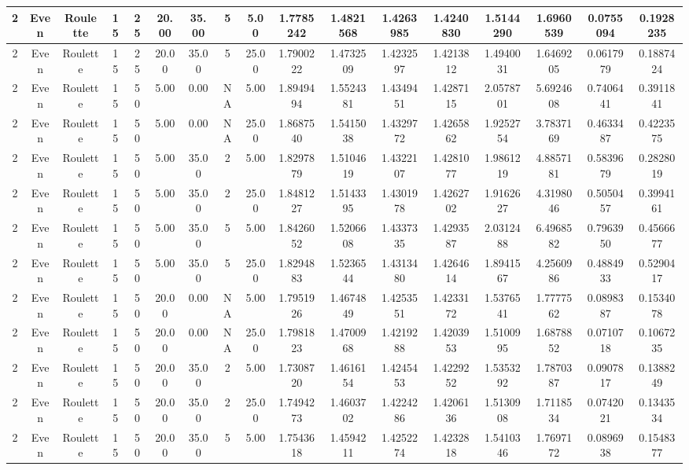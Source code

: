 \documentclass[a4paper]{article}
\begin{document}
\begin{center}
\begin{tabular}{ | c | c | c | c | c | c | c | c | c | c | c | c | c | c | c | c | c | }
		\hline
		2	&	Even	&	Roulette	&	15	&	25	&	20.00	&	35.00	&	5	&	5.00	&	1.7785242	&	1.4821568	&	1.4263985	&	1.4240830	&	1.5144290	&	1.6960539	&	0.0755094	&	0.1928235 \\
		\hline
		2	&	Even	&	Roulette	&	15	&	25	&	20.00	&	35.00	&	5	&	25.00	&	1.7900222	&	1.4732509	&	1.4232597	&	1.4213812	&	1.4940031	&	1.6469205	&	0.0617979	&	0.1887424 \\
		\hline
		2	&	Even	&	Roulette	&	15	&	50	&	5.00	&	0.00	&	NA	&	5.00	&	1.8949494	&	1.5524381	&	1.4349451	&	1.4287115	&	2.0578701	&	5.6924608	&	0.7406441	&	0.3911841 \\
		\hline
		2	&	Even	&	Roulette	&	15	&	50	&	5.00	&	0.00	&	NA	&	25.00	&	1.8687540	&	1.5415038	&	1.4329772	&	1.4265862	&	1.9252754	&	3.7837169	&	0.4633487	&	0.4223575 \\
		\hline
		2	&	Even	&	Roulette	&	15	&	50	&	5.00	&	35.00	&	2	&	5.00	&	1.8297879	&	1.5104619	&	1.4322107	&	1.4281077	&	1.9861219	&	4.8857181	&	0.5839679	&	0.2828019 \\
		\hline
		2	&	Even	&	Roulette	&	15	&	50	&	5.00	&	35.00	&	2	&	25.00	&	1.8481227	&	1.5143395	&	1.4301978	&	1.4262702	&	1.9162627	&	4.3198046	&	0.5050457	&	0.3994161 \\
		\hline
		2	&	Even	&	Roulette	&	15	&	50	&	5.00	&	35.00	&	5	&	5.00	&	1.8426052	&	1.5206608	&	1.4337335	&	1.4293587	&	2.0312488	&	6.4968582	&	0.7963950	&	0.4566677 \\
		\hline
		2	&	Even	&	Roulette	&	15	&	50	&	5.00	&	35.00	&	5	&	25.00	&	1.8294883	&	1.5236544	&	1.4313480	&	1.4264614	&	1.8941567	&	4.2560986	&	0.4884933	&	0.5290417 \\
		\hline
		2	&	Even	&	Roulette	&	15	&	50	&	20.00	&	0.00	&	NA	&	5.00	&	1.7951926	&	1.4674849	&	1.4253551	&	1.4233172	&	1.5376541	&	1.7777562	&	0.0898387	&	0.1534078 \\
		\hline
		2	&	Even	&	Roulette	&	15	&	50	&	20.00	&	0.00	&	NA	&	25.00	&	1.7981823	&	1.4700968	&	1.4219288	&	1.4203953	&	1.5100995	&	1.6878852	&	0.0710718	&	0.1067235 \\
		\hline
		2	&	Even	&	Roulette	&	15	&	50	&	20.00	&	35.00	&	2	&	5.00	&	1.7308720	&	1.4616154	&	1.4245453	&	1.4229252	&	1.5353292	&	1.7870387	&	0.0907817	&	0.1388249 \\
		\hline
		2	&	Even	&	Roulette	&	15	&	50	&	20.00	&	35.00	&	2	&	25.00	&	1.7494273	&	1.4603702	&	1.4224286	&	1.4206136	&	1.5130908	&	1.7118534	&	0.0742021	&	0.1343534 \\
		\hline
		2	&	Even	&	Roulette	&	15	&	50	&	20.00	&	35.00	&	5	&	5.00	&	1.7543618	&	1.4594211	&	1.4252274	&	1.4232818	&	1.5410346	&	1.7697172	&	0.0896938	&	0.1548377 \\

\end{tabular}
\end{center}
\end{document}

